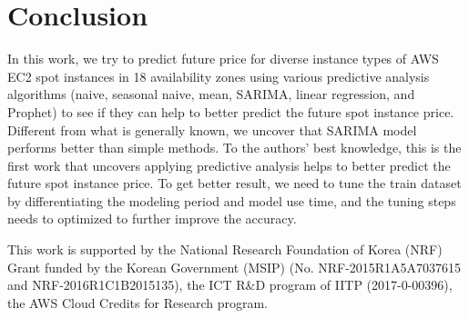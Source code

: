 \documentclass[graybox]{svmult}
\begin{document}
\section{Conclusion}
In this work, we try to predict future price for diverse instance types of AWS EC2 spot instances in 18 availability zones using various predictive analysis algorithms (naive, seasonal naive, mean, SARIMA, linear regression, and Prophet) to see if they can help to better predict the future spot instance price. Different from what is generally known, we uncover that SARIMA model performs better than simple methods. To the authors' best knowledge, this is the first work that uncovers applying predictive analysis helps to better predict the future spot instance price. To get better result, we need to tune the train dataset by differentiating the modeling period and model use time, and the tuning steps needs to optimized to further improve the accuracy.  

\begin{acknowledgement}
This work is supported by the National Research Foundation of Korea (NRF) Grant funded by the Korean Government (MSIP) (No. NRF-2015R1A5A7037615 and NRF-2016R1C1B2015135), the ICT R\&D program of IITP (2017-0-00396), the AWS Cloud Credits for Research program.
\end{acknowledgement}


\end{document}
